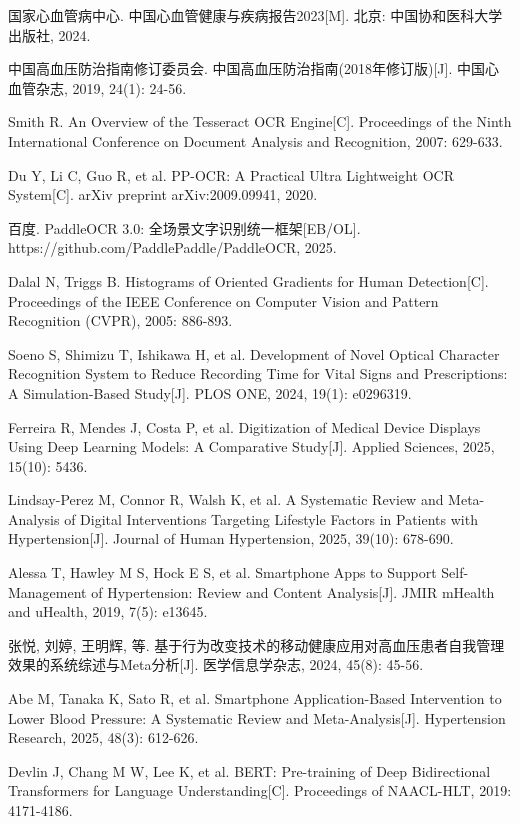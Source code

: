 \documentclass[zihao=-4,a4paper]{ctexart}
\begin{document}
\begin{enumerate}[label={[\arabic*]}]
    \item 国家心血管病中心. 中国心血管健康与疾病报告2023[M]. 北京: 中国协和医科大学出版社, 2024.
    \item 中国高血压防治指南修订委员会. 中国高血压防治指南(2018年修订版)[J]. 中国心血管杂志, 2019, 24(1): 24-56.
    \item Smith R. An Overview of the Tesseract OCR Engine[C]. Proceedings of the Ninth International Conference on Document Analysis and Recognition, 2007: 629-633.
    \item Du Y, Li C, Guo R, et al. PP-OCR: A Practical Ultra Lightweight OCR System[C]. arXiv preprint arXiv:2009.09941, 2020.
    \item 百度. PaddleOCR 3.0: 全场景文字识别统一框架[EB/OL]. https://github.com/PaddlePaddle/PaddleOCR, 2025.
    \item Dalal N, Triggs B. Histograms of Oriented Gradients for Human Detection[C]. Proceedings of the IEEE Conference on Computer Vision and Pattern Recognition (CVPR), 2005: 886-893.
    \item Soeno S, Shimizu T, Ishikawa H, et al. Development of Novel Optical Character Recognition System to Reduce Recording Time for Vital Signs and Prescriptions: A Simulation-Based Study[J]. PLOS ONE, 2024, 19(1): e0296319.
    \item Ferreira R, Mendes J, Costa P, et al. Digitization of Medical Device Displays Using Deep Learning Models: A Comparative Study[J]. Applied Sciences, 2025, 15(10): 5436.
    \item Lindsay-Perez M, Connor R, Walsh K, et al. A Systematic Review and Meta-Analysis of Digital Interventions Targeting Lifestyle Factors in Patients with Hypertension[J]. Journal of Human Hypertension, 2025, 39(10): 678-690.
    \item Alessa T, Hawley M S, Hock E S, et al. Smartphone Apps to Support Self-Management of Hypertension: Review and Content Analysis[J]. JMIR mHealth and uHealth, 2019, 7(5): e13645.
    \item 张悦, 刘婷, 王明辉, 等. 基于行为改变技术的移动健康应用对高血压患者自我管理效果的系统综述与Meta分析[J]. 医学信息学杂志, 2024, 45(8): 45-56.
    \item Abe M, Tanaka K, Sato R, et al. Smartphone Application-Based Intervention to Lower Blood Pressure: A Systematic Review and Meta-Analysis[J]. Hypertension Research, 2025, 48(3): 612-626.
    \item Devlin J, Chang M W, Lee K, et al. BERT: Pre-training of Deep Bidirectional Transformers for Language Understanding[C]. Proceedings of NAACL-HLT, 2019: 4171-4186.

\end{enumerate}
\end{document}

